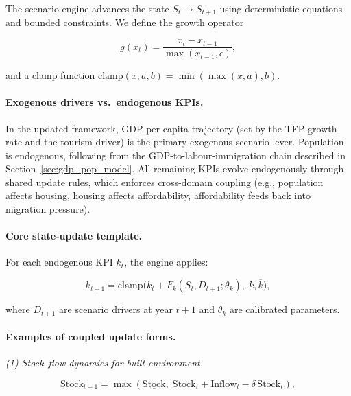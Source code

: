 \documentclass[urbansci,article,submit,pdftex,moreauthors]{Definitions/mdpi}
\begin{document}
The scenario engine advances the state $S_t \rightarrow S_{t+1}$ using
deterministic equations and bounded constraints. We define the growth operator

\begin{linenomath}
\begin{equation}
g(x_t)=\frac{x_t-x_{t-1}}{\max(x_{t-1},\epsilon)},
\end{equation}
\end{linenomath}

and a clamp function $\mathrm{clamp}(x,a,b)=\min(\max(x,a),b)$.

\paragraph{Exogenous drivers vs.\ endogenous KPIs.}
In the updated framework, GDP per capita trajectory (set by the TFP growth rate
and the tourism driver) is the primary exogenous scenario lever. Population is
endogenous, following from the GDP-to-labour-immigration chain described in
Section~\ref{sec:gdp_pop_model}. All remaining KPIs evolve endogenously through
shared update rules, which enforces cross-domain coupling (e.g., population
affects housing, housing affects affordability, affordability feeds back into
migration pressure).

\paragraph{Core state-update template.}
For each endogenous KPI $k_t$, the engine applies:

\begin{linenomath}
\begin{equation}
k_{t+1} = \mathrm{clamp}\Big(k_t + F_k(S_t, D_{t+1};\theta_k),\;
                              \underline{k},\overline{k}\Big),
\end{equation}
\end{linenomath}

where $D_{t+1}$ are scenario drivers at year $t{+}1$ and $\theta_k$ are
calibrated parameters.

\paragraph{Examples of coupled update forms.}

\textit{(1) Stock--flow dynamics for built environment.}

\begin{linenomath}
\begin{equation}
\mathrm{Stock}_{t+1} =
    \max\!\left(\underline{\mathrm{Stock}},\;
               \mathrm{Stock}_t + \mathrm{Inflow}_t - \delta\,\mathrm{Stock}_t
         \right),
\end{equation}
\end{linenomath}
\end{document}
